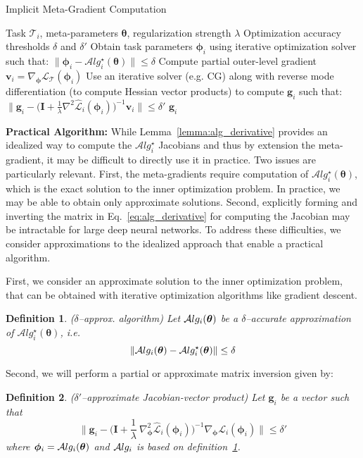 \documentclass{article} \usepackage[nonatbib, final]{mod_neurips}
\newcommand{\eye}{\boldsymbol{I}}
\newcommand{\task}{\mathcal{T}}
\newtheorem{definition}{Definition}
\newcommand{\param}{{\bm{\phi}}}               \newcommand{\paramspace}{\Phi}
\newcommand{\prior}{{\bm{\theta}}}               \newcommand{\priorspace}{\Theta}
\newcommand{\fn}{\mathcal{L}}                  \newcommand{\udfn}{\tilde{\fn}}        \newcommand{\fnht}{\hat{\fn}}        \newcommand{\ud}{\alg}
\newcommand{\algstar}{\mathcal{A}lg^\star}
\newcommand{\pgrad}{\nabla}
\begin{document}
\begin{algorithm}[t!]
   \caption{Implicit Meta-Gradient Computation}
   \label{alg:implicit_grad}
\begin{algorithmic}[1]
 Task $\task_i$, meta-parameters $\prior$, regularization strength $\lambda$
 Optimization accuracy thresholds $\delta$ and $\delta'$
\STATE Obtain task parameters $\param_i$ using iterative optimization solver such that:
$
\|\param_i- \algstar_i(\prior)\| \leq \delta
$
\STATE Compute partial outer-level gradient $\bm{v}_i=\pgrad_\param \fn_\task(\param_i)$
\STATE Use an iterative solver (e.g. CG) along with  reverse mode differentiation (to compute Hessian vector products) to compute $\bm{g}_i$ such that: 
$
\|\bm{g}_i - \big( \eye + \frac{1}{\lambda} \pgrad^2 \fnht_i(\param_i) \big)^{-1} \bm{v}_i\|\leq \delta'
$
 $\bm{g}_i$
\end{algorithmic}
\end{algorithm}


\textbf{Practical Algorithm:} While Lemma~\ref{lemma:alg_derivative} provides an idealized way to compute the $\algstar_i$ Jacobians and thus by extension the meta-gradient, it may be difficult to directly use it in practice. Two issues are particularly relevant. First, the meta-gradients require computation of $\algstar_i(\prior)$, which is the exact solution to the inner optimization problem. In practice, we may be able to obtain only approximate solutions. Second, explicitly forming and inverting the matrix in Eq.~\ref{eq:alg_derivative} for computing the Jacobian may be intractable for large deep neural networks. To address these difficulties, we consider approximations to the idealized approach that enable a practical algorithm.

First, we consider an approximate solution to the inner optimization
problem, that can be obtained with iterative optimization algorithms
like gradient descent.  
\begin{definition}
\label{def:delta_approx_alg}
($\delta$--approx. algorithm)
Let $\alg_i(\prior)$ be a $\delta$--accurate approximation of $\algstar_i(\prior)$, i.e.
\[
\| \alg_i(\prior) - \algstar_i(\prior) \| \leq \delta
\]
\end{definition}

Second, we will perform a partial or approximate matrix inversion given by:
\begin{definition}
\label{def:delta_approx_inversion}
($\delta'$--approximate Jacobian-vector product) Let $\bm{g}_i$ be a vector such that
\[
\| \bm{g}_i - \bigg(\eye + \frac{1}{\lambda}~\pgrad_\param^2 \fnht_i(\param_i) \bigg)^{-1} \pgrad_\param \fn_i(\param_i) \| \leq \delta'
\]
where $\param_i = \alg_i(\prior)$ and $\mathcal{A}lg_i$ is based on definition~\ref{def:delta_approx_alg}.
\end{definition}
\end{document}
